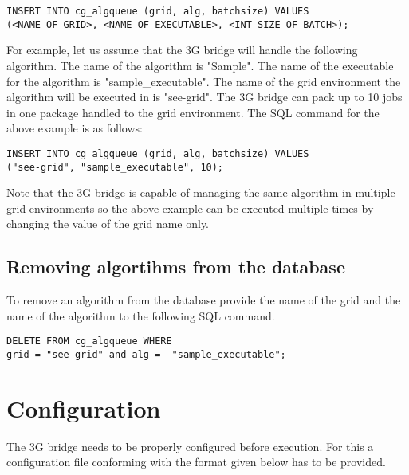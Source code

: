 \documentclass[a4paper, 12pt]{article}
\begin{document}
\begin{verbatim}
INSERT INTO cg_algqueue (grid, alg, batchsize) VALUES 
(<NAME OF GRID>, <NAME OF EXECUTABLE>, <INT SIZE OF BATCH>);
\end{verbatim}

For example, let us assume that the 3G bridge will handle the following algorithm. The name of the algorithm is "Sample". The name of the executable for the algorithm is "sample\_executable". The name of the grid environment the algorithm will be executed in is "see-grid". The 3G bridge can pack up to 10 jobs in one package handled to the grid environment. The SQL command for the above example is as follows:

\begin{verbatim}
INSERT INTO cg_algqueue (grid, alg, batchsize) VALUES 
("see-grid", "sample_executable", 10);
\end{verbatim}

Note that the 3G bridge is capable of managing the same algorithm in multiple grid environments so the above example can be executed multiple times by changing the value of the grid name only.

\subsection{Removing algortihms from the database}

To remove an algorithm from the database provide the name of the grid and the name of the algorithm to   the following SQL command.

\begin{verbatim}
DELETE FROM cg_algqueue WHERE
grid = "see-grid" and alg =  "sample_executable";
\end{verbatim}

\section{Configuration}

The 3G bridge needs to be properly configured before execution. For this a configuration file conforming with the format given below has to be provided. 
\end{document}
